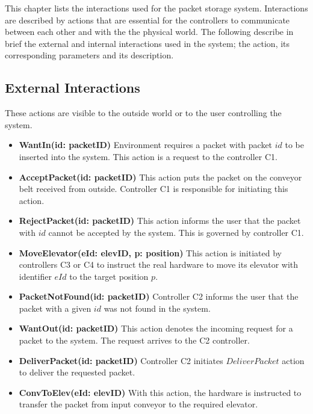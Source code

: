 \label{sec:ext_interactions}
This chapter lists the interactions used for the packet storage system. Interactions are described by actions that are essential for the controllers to communicate between each other and with the the physical world. The following describe in brief the external and internal interactions used in the system; the action, its corresponding parameters and its description.

\subsection*{External Interactions} These actions are visible to the outside world or to the user controlling the system.

\begin{itemize}
\item \textbf{WantIn(id: packetID)}
Environment requires a packet with packet $id$ to be inserted into the system. This action is a request to the controller C1.

\item \textbf{AcceptPacket(id: packetID)}
This action puts the packet on the conveyor belt received from outside. Controller C1 is responsible for initiating this action.

\item \textbf{RejectPacket(id: packetID)}
This action informs the user that the packet with $id$ cannot be accepted by the system. This is governed by controller C1.

\item \textbf{MoveElevator(eId: elevID, p: position)}
This action is initiated by controllers C3 or C4 to instruct the real hardware to move its elevator with identifier $eId$ to the target position $p$.

\item \textbf{PacketNotFound(id: packetID)}
Controller C2 informs the user that the packet with a given $id$ was not found in the system.

\item \textbf{WantOut(id: packetID)}
This action denotes the incoming request for a packet to the system. The request arrives to the C2 controller.

\item \textbf{DeliverPacket(id: packetID)}
Controller C2 initiates $DeliverPacket$ action to deliver the requested packet.

\item \textbf{ConvToElev(eId: elevID)}
With this action, the hardware is instructed to transfer the packet from input conveyor to the required elevator.


\end{itemize}
